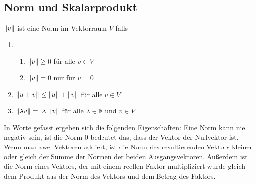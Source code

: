 


%


\subsection{Norm und Skalarprodukt}
\author{Vivien Thi, Max Braun, Luca Bohn}
\begin{Def}
$\left\lVert v\right\rVert$ ist eine Norm im Vektorraum $V$ falls
\begin{enumerate}
\item 
\begin{enumerate}
\item $\left\lVert v\right\rVert \geq 0$ für alle $v \in V$
\item $\left\lVert v\right\rVert = 0$ nur für $v = 0$
\end{enumerate}
\item $\left\lVert u+v\right\rVert \leq \left\lVert u\right\rVert + \left\lVert v\right\rVert$ für alle $v \in V$
\item $\left\lVert\lambda v\right\rVert = |\lambda| \left\lVert v\right\rVert$ für alle $\lambda \in \mathbb{R}$ und $v \in V$
\end{enumerate}
\end{Def}
In Worte gefasst ergeben sich die folgenden Eigenschaften: Eine Norm kann nie negativ sein, ist die Norm 0 bedeutet das, dass der Vektor der Nullvektor ist. Wenn man zwei Vektoren
addiert, ist die Norm des resultierenden Vektors kleiner oder gleich der Summe der Normen der beiden Ausgangsvektoren. Außerdem ist die
Norm eines Vektors, der mit einem reellen Faktor multipliziert wurde gleich dem Produkt aus der Norm des Vektors und dem 
Betrag des Faktors.

